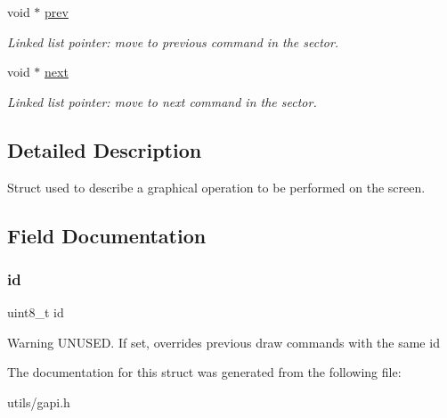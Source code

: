 \begin{DoxyCompactItemize}
void $\ast$ \mbox{\hyperlink{struct_draw_cmd_af714e69444763fb9a76ec901a014baf1}{prev}}
\begin{DoxyCompactList}\small\item\em Linked list pointer\+: move to previous command in the sector. \end{DoxyCompactList}\item 
\mbox{\label{struct_draw_cmd_a75b19ffcca77bfc647ff02695958fd95}} 
void $\ast$ \mbox{\hyperlink{struct_draw_cmd_a75b19ffcca77bfc647ff02695958fd95}{next}}
\begin{DoxyCompactList}\small\item\em Linked list pointer\+: move to next command in the sector. \end{DoxyCompactList}\end{DoxyCompactItemize}


\subsection{Detailed Description}
Struct used to describe a graphical operation to be performed on the screen. 

\subsection{Field Documentation}
\mbox{\label{struct_draw_cmd_a1e6927fa1486224044e568f9c370519b}} 
\subsubsection{\texorpdfstring{id}{id}}
{\footnotesize\ttfamily uint8\+\_\+t id}

\begin{DoxyWarning}{Warning}
U\+N\+U\+S\+ED. If set, overrides previous draw commands with the same id 
\end{DoxyWarning}


The documentation for this struct was generated from the following file\+:\begin{DoxyCompactItemize}
\item 
utils/gapi.\+h\end{DoxyCompactItemize}

